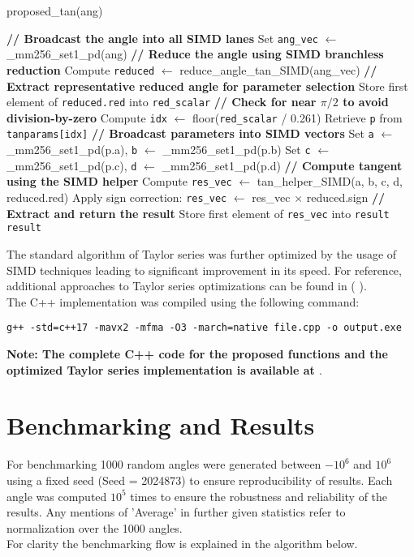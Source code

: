 \documentclass[12pt,twoside, letterpaper, margin=1in]{article}
\begin{document}
\begin{algorithm}[H]
\caption{proposed\_tan(ang)}
%
\textbf{// Broadcast the angle into all SIMD lanes}\;
Set \texttt{ang\_vec} $\gets$ \_mm256\_set1\_pd(ang)\;
%
\textbf{// Reduce the angle using SIMD branchless reduction}\;
Compute \texttt{reduced} $\gets$ reduce\_angle\_tan\_SIMD(ang\_vec)\;
%
\textbf{// Extract representative reduced angle for parameter selection}\;
Store first element of \texttt{reduced.red} into \texttt{red\_scalar}\;
%
\textbf{// Check for near $\pi/2$ to avoid division-by-zero}\;
%
Compute \texttt{idx} $\gets$ floor(\texttt{red\_scalar} / 0.261)\;
Retrieve \texttt{p} from \texttt{tanparams[idx]}\;
%
\textbf{// Broadcast parameters into SIMD vectors}\;
Set \texttt{a} $\gets$ \_mm256\_set1\_pd(p.a), \quad \texttt{b} $\gets$ \_mm256\_set1\_pd(p.b)\;
Set \texttt{c} $\gets$ \_mm256\_set1\_pd(p.c), \quad \texttt{d} $\gets$ \_mm256\_set1\_pd(p.d)\;
%
\textbf{// Compute tangent using the SIMD helper}\;
Compute \texttt{res\_vec} $\gets$ tan\_helper\_SIMD(a, b, c, d, reduced.red)\;
Apply sign correction: \texttt{res\_vec} $\gets$ res\_vec $\times$ reduced.sign\;
%
\textbf{// Extract and return the result}\;
Store first element of \texttt{res\_vec} into \texttt{result}\;
\Return \texttt{result}\;
\end{algorithm}

The standard algorithm of Taylor series was further optimized by the usage of SIMD techniques leading to significant improvement in its speed. For reference, additional approaches to Taylor series optimizations can be found in (\cite{tayloropt1} \cite{tayloropt2}). \\
The C++ implementation was compiled using the following command:
\begin{verbatim}
g++ -std=c++17 -mavx2 -mfma -O3 -march=native file.cpp -o output.exe
\end{verbatim}
{\small \textbf{Note: The complete C++ code for the proposed functions and the optimized Taylor series implementation is available at \cite{gitcode}}}.


\section{Benchmarking and Results}

For benchmarking 1000 random angles were generated between $-10^6$ and $10^6$ using a fixed seed (Seed  = 2024873) to ensure reproducibility of results. Each angle was computed $10^5$ times to ensure the robustness and reliability of the results. Any mentions of 'Average' in further given statistics refer to normalization over the 1000 angles.\\
For clarity the benchmarking flow is explained in the algorithm below.
\end{document}
